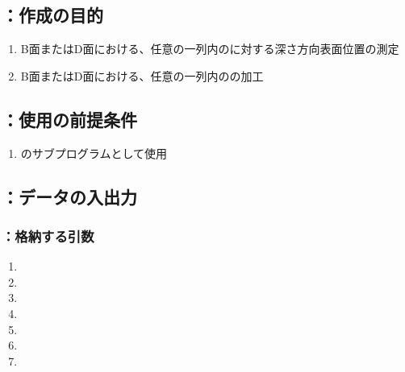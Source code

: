 \clearpage


\subsection{\DLtwoBD：作成の目的}
\begin{enumerate}[label*=\sarrow]
\item B面またはD面における、任意の一列内の\Dimple に対する深さ方向表面位置の測定
\item B面またはD面における、任意の一列内の\Dimple の加工
\end{enumerate}


\subsection{\DLtwoBD：使用の前提条件}
\begin{enumerate}[label*=\sarrow]
\item \DLone のサブプログラムとして使用
\end{enumerate}


\subsection{\DLtwoBD：データの入出力}

\subsubsection{\DLtwoBD：格納する引数}
\begin{enumerate}[label*=\sarrow]
\item \PMBDFaceSelectionFlag
\item \PMDimpleAngle
\item \PMDimpleHorizontalPitch
\item \PMDimpleOddRowLength
\item \PMDimpleEvenRowLength
\item \PMDimpleRowNum
\item \PMDimpleDepth
\end{enumerate}

